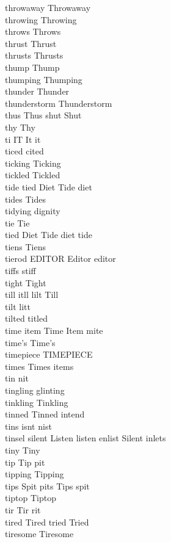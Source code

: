 throwaway Throwaway\\
throwing Throwing\\
throws Throws\\
thrust Thrust\\
thrusts Thrusts\\
thump Thump\\
thumping Thumping\\
thunder Thunder\\
thunderstorm Thunderstorm\\
thus Thus shut Shut\\
thy Thy\\
ti IT It it\\
ticed cited\\
ticking Ticking\\
tickled Tickled\\
tide tied Diet Tide diet\\
tides Tides\\
tidying dignity\\
tie Tie\\
tied Diet Tide diet tide\\
tiens Tiens\\
tierod EDITOR Editor editor\\
tiffs stiff\\
tight Tight\\
till itll lilt Till\\
tilt litt\\
tilted titled\\
time item Time Item mite\\
time's Time's\\
timepiece TIMEPIECE\\
times Times items\\
tin nit\\
tingling glinting\\
tinkling Tinkling\\
tinned Tinned intend\\
tins isnt nist\\
tinsel silent Listen listen enlist Silent inlets\\
tiny Tiny\\
tip Tip pit\\
tipping Tipping\\
tips Spit pits Tips spit\\
tiptop Tiptop\\
tir Tir rit\\
tired Tired tried Tried\\
tiresome Tiresome\\
